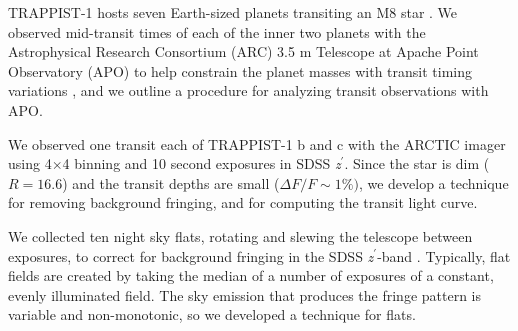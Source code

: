 

\newcommand{\sdssz}{SDSS \textsl{z$^\prime$}\xspace}

% 










TRAPPIST-1 hosts seven Earth-sized planets transiting an M8 star \citep{Gillon2016, Gillon2017}. We observed mid-transit times of each of the inner two planets with the Astrophysical Research Consortium (ARC) 3.5 m Telescope at Apache Point Observatory (APO) to help constrain the planet masses with transit timing variations \citep{Agol2005, Holman2005}, and we outline a procedure for analyzing transit observations with APO.

We observed one transit each of TRAPPIST-1 b and c with the ARCTIC imager using 4$\times$4 binning and 10 second exposures in \sdssz \citep{Huehnerhoff2016}. Since the star is dim ($R = 16.6$) and the transit depths are small ($\Delta F/F \sim 1\%)$, we develop a technique for removing background fringing, and for computing the transit light curve. 

We collected ten night sky flats, rotating and slewing the telescope between exposures, to correct for background fringing in the \sdssz-band \citep{Howell2006}. Typically, flat fields are created by taking the median of a number of exposures of a constant, evenly illuminated field. The sky emission that produces the fringe pattern is variable and non-monotonic, so we developed a technique for flats.

